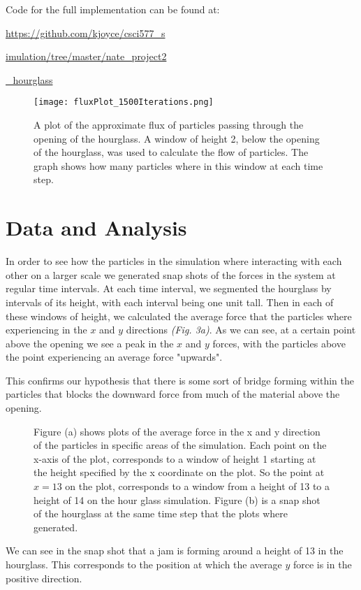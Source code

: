 \documentclass{article}%
\newcommand{\tab} {\hspace{5mm}}
\begin{document}
Code for the full implementation can be found at:

\noindent\url{https://github.com/kjoyce/csci577_s}

\noindent\url{imulation/tree/master/nate_project2}

\noindent\url{_hourglass}

\begin{figure}[t]
	\centering
		\texttt{[image: fluxPlot\_1500Iterations.png]}
	\label{fig:fig01} 
	\caption{A plot of the approximate flux of particles passing through the opening of the hourglass. A window of height 2, below the opening of the hourglass, was used to calculate the flow of particles. The graph shows how many particles where in this window at each time step.} 
	
\end{figure}

\section{Data and Analysis}




\tab In order to see how the particles in the simulation where interacting with each other on a larger scale we generated snap shots of the forces in the system at regular time intervals. At each time interval, we segmented the hourglass by intervals of its height, with each interval being one unit tall. Then in each of these windows of height, we calculated the average force that the particles where experiencing in the $x$ and $y$ directions \textit{(Fig. 3a)}. As we can see, at a certain point above the opening we see a peak in the $x$ and $y$ forces, with the particles above the point experiencing an average force "upwards". 

	This confirms our hypothesis that there is some sort of bridge forming within the particles that blocks the downward force from much of the material above the opening. 
\begin{figure}[h]
\centering
	\caption{Figure (a) shows plots of the average force in the x and y direction of the particles in specific areas of the simulation. Each point on the x-axis of the plot, corresponds to a window of height 1 starting at the height specified by the x coordinate on the plot. So the point at $x = 13$ on the plot, corresponds to a window from a height of 13 to a height of 14 on the hour glass simulation. Figure (b) is a snap shot of the hourglass at the same time step that the plots where generated.} 	 
\end{figure}
We can see in the snap shot that a jam is forming around a height of 13 in the hourglass. This corresponds to the position at which the average $y$ force is in the positive direction.
	
\end{document}

